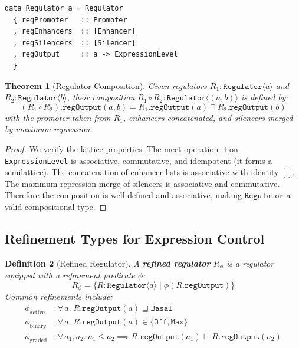 \documentclass[12pt,a4paper]{article}
\newtheorem{theorem}{Theorem}[section]
\newtheorem{definition}[theorem]{Definition}
\newcommand{\ExprLevel}{\texttt{ExpressionLevel}}
\newcommand{\Reg}[1]{\texttt{Regulator}\ensuremath{\langle}#1\ensuremath{\rangle}}
\begin{document}
\begin{lstlisting}[caption={Regulator type definition}]
data Regulator a = Regulator
  { regPromoter   :: Promoter
  , regEnhancers  :: [Enhancer]
  , regSilencers  :: [Silencer]
  , regOutput     :: a -> ExpressionLevel
  }
\end{lstlisting}

\begin{theorem}[Regulator Composition]\label{thm:regulator-compose}
Given regulators $R_1 : \Reg{a}$ and $R_2 : \Reg{b}$, their composition $R_1 \circ R_2 : \Reg{(a,b)}$ is defined by:
\[
(R_1 \circ R_2).\texttt{regOutput}(a,b) = R_1.\texttt{regOutput}(a) \sqcap R_2.\texttt{regOutput}(b)
\]
with the promoter taken from $R_1$, enhancers concatenated, and silencers merged by maximum repression.
\end{theorem}

\begin{proof}
We verify the lattice properties.  The meet operation $\sqcap$ on \ExprLevel{} is associative, commutative, and idempotent (it forms a semilattice).  The concatenation of enhancer lists is associative with identity $[]$.  The maximum-repression merge of silencers is associative and commutative.  Therefore the composition is well-defined and associative, making $\texttt{Regulator}$ a valid compositional type.
\end{proof}

\subsection{Refinement Types for Expression Control}

\begin{definition}[Refined Regulator]\label{def:refined-regulator}
A \textbf{refined regulator} $R_\phi$ is a regulator equipped with a refinement predicate $\phi$:
\[
R_\phi = \{R : \Reg{a} \mid \phi(R.\texttt{regOutput})\}
\]
Common refinements include:
\begin{align}
\phi_{\text{active}} &: \forall\, a.\; R.\texttt{regOutput}(a) \sqsupseteq \texttt{Basal} \\
\phi_{\text{binary}} &: \forall\, a.\; R.\texttt{regOutput}(a) \in \{\texttt{Off}, \texttt{Max}\} \\
\phi_{\text{graded}} &: \forall\, a_1, a_2.\; a_1 \leq a_2 \implies R.\texttt{regOutput}(a_1) \sqsubseteq R.\texttt{regOutput}(a_2)
\end{align}
\end{definition}
\end{document}
